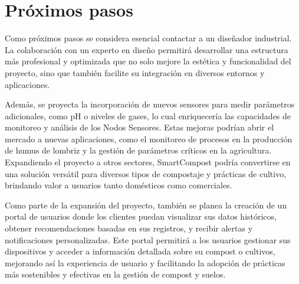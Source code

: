 


\section{Próximos pasos}


Como próximos pasos se considera esencial contactar a un diseñador industrial. La colaboración con un experto en diseño permitirá desarrollar una estructura más profesional y optimizada que no solo mejore la estética y funcionalidad del proyecto, sino que también facilite su integración en diversos entornos y aplicaciones.

Además, se proyecta la incorporación de nuevos sensores para medir parámetros adicionales, como pH o niveles de gases, lo cual enriquecería las capacidades de monitoreo y análisis de los Nodos Sensores. Estas mejoras podrían abrir el mercado a nuevas aplicaciones, como el monitoreo de procesos en la producción de humus de lombriz y la gestión de parámetros críticos en la agricultura. Expandiendo el proyecto a otros sectores, SmartCompost podría convertirse en una solución versátil para diversos tipos de compostaje y prácticas de cultivo, brindando valor a usuarios tanto domésticos como comerciales.

Como parte de la expansión del proyecto, también se planea la creación de un portal de usuarios donde los clientes puedan visualizar sus datos históricos, obtener recomendaciones basadas en sus registros, y recibir alertas y notificaciones personalizadas. Este portal permitirá a los usuarios gestionar sus dispositivos y acceder a información detallada sobre su compost o cultivos, mejorando así la experiencia de usuario y facilitando la adopción de prácticas más sostenibles y efectivas en la gestión de compost y suelos.

